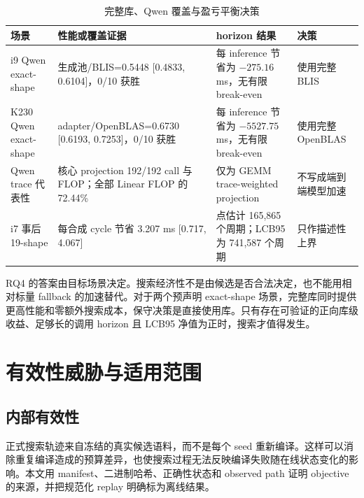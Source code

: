 \begin{table}[!htbp]
  \centering
  \caption{完整库、Qwen 覆盖与盈亏平衡决策}
  \label{tab:chapter5-economics}
  \begin{tabularx}{\textwidth}{
    @{}
    >{\raggedright\arraybackslash}p{}
    >{\raggedright\arraybackslash}p{}
    >{\raggedright\arraybackslash}p{}
    >{\raggedright\arraybackslash}X
    @{}
  }
    \toprule
    \textbf{场景} & \textbf{性能或覆盖证据} & \textbf{horizon 结果} & \textbf{决策} \\
    \midrule
    i9 Qwen exact-shape &
    生成池/BLIS=0.5448 [0.4833, 0.6104]，0/10 获胜 &
    每 inference 节省为 $-275.16$ ms，无有限 break-even &
    使用完整 BLIS \\
    K230 Qwen exact-shape &
    adapter/OpenBLAS=0.6730 [0.6193, 0.7253]，0/10 获胜 &
    每 inference 节省为 $-5527.75$ ms，无有限 break-even &
    使用完整 OpenBLAS \\
    Qwen trace 代表性 &
    核心 projection 192/192 call 与 FLOP；全部 Linear FLOP 的 72.44\% &
    仅为 GEMM trace-weighted projection &
    不写成端到端模型加速 \\
    i7 事后 19-shape &
    每合成 cycle 节省 3.207 ms [0.717, 4.067] &
    点估计 165,865 个周期；LCB95 为 741,587 个周期 &
    只作描述性上界 \\
    \bottomrule
  \end{tabularx}
\end{table}

RQ4 的答案由目标场景决定。搜索经济性不是由候选是否合法决定，也不能用相对标量 fallback 的加速替代。对于两个预声明 exact-shape 场景，完整库同时提供更高性能和零额外搜索成本，保守决策是直接使用库。只有存在可验证的正向库级收益、足够长的调用 horizon 且 LCB95 净值为正时，搜索才值得发生。

\section{有效性威胁与适用范围}

\subsection{内部有效性}

正式搜索轨迹来自冻结的真实候选语料，而不是每个 seed 重新编译。这样可以消除重复编译造成的预算差异，也使搜索过程无法反映编译失败随在线状态变化的影响。本文用 manifest、二进制哈希、正确性状态和 observed path 证明 objective 的来源，并把规范化 replay 明确标为离线结果。

